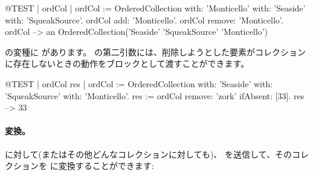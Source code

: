 \documentclass[a4paper,10pt,twoside]{book}
\begin{document}
\begin{code}{@TEST | ordCol | ordCol := OrderedCollection with: 'Monticello' with: 'Seaside' with: 'SqueakSource'.}
ordCol add: 'Monticello'.
ordCol remove: 'Monticello'.
ordCol --> an OrderedCollection('Seaside' 'SqueakSource' 'Monticello')
\end{code}

 の変種に  があります。
の第二引数には、削除しようとした要素がコレクションに存在しないときの動作をブロックとして渡すことができます。

\begin{code}{@TEST | ordCol res | ordCol := OrderedCollection with: 'Seaside' with: 'SqueakSource' with: 'Monticello'.}
res := ordCol remove: 'zork' ifAbsent: [33].
res --> 33
\end{code}

\paragraph{変換。}
 に対して(またはその他どんなコレクションに対しても)、 を送信して、そのコレクションを  に変換することができます:




\end{document}
